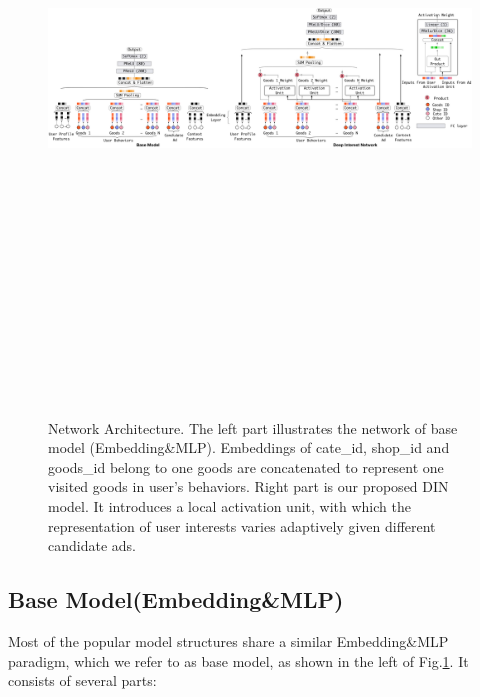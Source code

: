 \begin{figure}[!t]
\centering
\includegraphics[height=7in, width=7in,keepaspectratio]{images/omni/DIN_new.png}
\caption{Network Architecture. The left part illustrates the network of base model (Embedding\&MLP). Embeddings of cate\_id, shop\_id and goods\_id belong to one goods are concatenated to represent one visited goods in user's behaviors. Right part is our proposed DIN model. It introduces a local activation unit, with which the representation of user interests varies adaptively given different candidate ads.}
\label{model_arch}
\end{figure}


\subsection{Base Model(Embedding\&MLP)}
\label{sec:basemodel}
Most of the popular model structures \cite{deep_crossing,widedeep,youtube:recommend} share a similar Embedding\&MLP paradigm, which we refer to as base model, as shown in the left of Fig.\ref{model_arch}. It consists of several parts:
